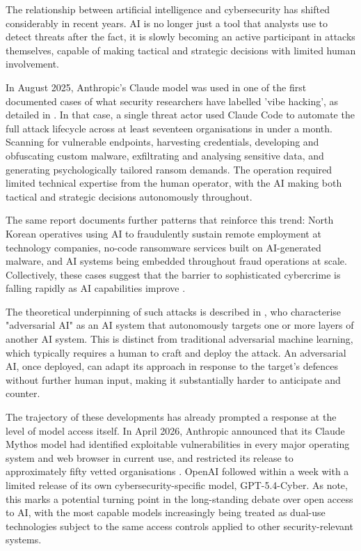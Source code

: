 The relationship between artificial intelligence and cybersecurity has shifted considerably in recent years. AI is no longer just a tool that analysts use to detect threats after the fact, it is slowly becoming an active participant in attacks themselves, capable of making tactical and strategic decisions with limited human involvement.

In August 2025, Anthropic's Claude model was used in one of the first documented cases of what security researchers have labelled 'vibe hacking', as detailed in \cite{ThreatReport2025}. In that case, a single threat actor used Claude Code to automate the full attack lifecycle across at least seventeen organisations in under a month. Scanning for vulnerable endpoints, harvesting credentials, developing and obfuscating custom malware, exfiltrating and analysing sensitive data, and generating psychologically tailored ransom demands. The operation required limited technical expertise from the human operator, with the AI making both tactical and strategic decisions autonomously throughout. 

The same report documents further patterns that reinforce this trend: North Korean operatives using AI to fraudulently sustain remote employment at technology companies, no-code ransomware services built on AI-generated malware, and AI systems being embedded throughout fraud operations at scale. Collectively, these cases suggest that the barrier to sophisticated cybercrime is falling rapidly as AI capabilities improve \parencite{ThreatReport2025}.

The theoretical underpinning of such attacks is described in \textcite{CarnegieMellonAI}, who characterise "adversarial AI" as an AI system that autonomously targets one or more layers of another AI system. This is distinct from traditional adversarial machine learning, which typically requires a human to craft and deploy the attack. An adversarial AI, once deployed, can adapt its approach in response to the target's defences without further human input, making it substantially harder to anticipate and counter.

The trajectory of these developments has already prompted a response at the level of model access itself. In April 2026, Anthropic announced that its Claude Mythos model had identified exploitable vulnerabilities in every major operating system and web browser in current use, and restricted its release to approximately fifty vetted organisations \parencite{MythosNature2026}. OpenAI followed within a week with a limited release of its own cybersecurity-specific model, GPT-5.4-Cyber. As \textcite{MythosNature2026} note, this marks a potential turning point in the long-standing debate over open access to AI, with the most capable models increasingly being treated as dual-use technologies subject to the same access controls applied to other security-relevant systems.

